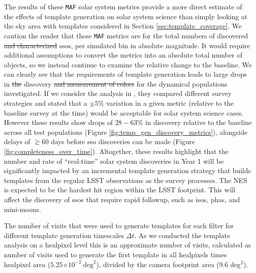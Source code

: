 \documentclass[preprintm,linenumbers]{aastex631}
\newcommand{\maf}{\texttt{MAF}\xspace}
\providecommand{\e}[1]{\ensuremath{\times 10^{#1}}}
\begin{document}
		The results of these \maf solar system metrics provide a more direct estimate of the effects of template generation on solar system science than simply looking at the sky area with templates considered in Section \ref{sec:template_coverage}. We caution the reader that these \maf metrics are for the total numbers of discovered \sout{and characterized} \glspl*{sso}, per simulated bin in absolute magnitude. It would require additional assumptions to convert the metrics into an absolute total number of objects, so we instead continue to examine the relative change to the baseline. 
		We can clearly see that the requirements of template generation leads to large drops in \sout{the} discovery \sout{and measurement of colors} for the dynamical populations investigated.
		If we consider the analysis in \cite{schwambTuningLegacySurvey2023}, they compared different survey strategies and stated that a $\pm5\%$ variation in a given metric (relative to the baseline survey at the time) would be acceptable for solar system science cases.
		However these results show drops of $28-63\%$ in discovery relative to the baseline across all test populations (Figure \ref{fig:temp_gen_discovery_metrics}), alongside delays of $\gtrsim 60$ days before \gls*{sso} discoveries can be made (Figure \ref{fig:completeness_over_time}).
		Altogether, these results highlight that the number and rate of ``real-time'' solar system discoveries in Year 1 will be significantly impacted by an incremental template generation strategy that builds templates from the regular LSST observations as the survey processes. The NES is expected to be the hardest hit region within the LSST footprint. 
		This will affect the discovery of \glspl*{sso} that require rapid followup, such as \glspl*{iso}, \glspl*{pha}, and mini-moons.
		

		\begin{table}
			\centering
			
			\caption{
				The number of visits that were used to generate templates for each filter for different template generation timescales $\Delta t$.
				As we conducted the template analysis on a healpixel level this is an approximate number of visits, calculated as number of visits used to generate the first template in all healpixels times healpixel area ($5.25\e{-2}\ \mathrm{deg}^2$), divided by the camera footprint area (9.6 deg$^2$).
			}
			\label{tab:year1_N_visits_templates}
		\end{table}
		
		
\end{document}
